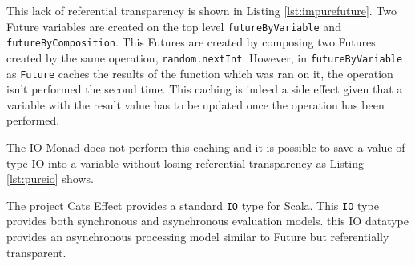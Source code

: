 \documentclass[../main.tex]{subfiles}
\begin{document}


This lack of referential transparency is shown in Listing \ref{lst:impurefuture}. Two
Future variables are created on the top level \texttt{futureByVariable} and
\texttt{futureByComposition}. This Futures are created by composing two Futures
created by the same operation, \texttt{random.nextInt}. However, in
\texttt{futureByVariable} as \texttt{Future} caches the results of the function
which was ran on it, the operation isn't performed the second time. This caching
is indeed a side effect given that a variable with the result value has to
be updated once the operation has been performed.

The IO Monad does not perform this caching and it is possible to save a value of type IO into a
variable without losing referential transparency as Listing \ref{lst:pureio} shows.

The project Cats Effect \autocite{CatsHome} provides a standard \texttt{IO} type for
Scala. This \texttt{IO} type provides both synchronous and asynchronous evaluation
models. this IO datatype provides an asynchronous processing model similar to
Future but referentially transparent.


\end{document}
